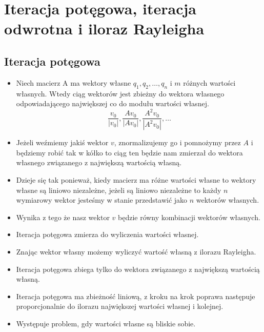 \documentclass[a4paper]{article}
\begin{document}
\section{Iteracja potęgowa, iteracja odwrotna i iloraz Rayleigha}
\subsection{Iteracja potęgowa}
\begin{itemize}
    \item Niech macierz A ma wektory własne $q_1, q_2, \dots ,q_n$ i $m$ różnych wartości własnych. Wtedy ciąg wektorów jest zbieżny do wektora własnego odpowiadającego największej co do modułu wartości własnej.
    \begin{equation*}
        \frac{v_0}{|v_0|} , \frac{Av_0}{|Av_0|}, \frac{A^2v_0}{|A^2v_0|}, \dots
    \end{equation*}
    \item Jeżeli weźmiemy jakiś wektor $v$, znormalizujemy go i pomnożymy przez $A$ i będziemy robić tak w kółko to ciąg ten będzie nam zmierzał do wektora własnego związanego z największą wartością własną.
    \item Dzieje się tak ponieważ, kiedy macierz ma różne wartości własne to wektory własne są liniowo niezależne, jeżeli są liniowo niezależne to każdy $n$ wymiarowy wektor jesteśmy w stanie przedstawić jako $n$ wektorów własnych.
    \item Wynika z tego że nasz wektor $v$ będzie równy kombinacji wektorów własnych.
    \item Iteracja potęgowa zmierza do wyliczenia wartości własnej.
    \item Znając wektor własny możemy wyliczyć wartość własną z ilorazu Rayleigha.
    \item Iteracja potęgowa zbiega tylko do wektora związanego z największą wartością własną.
    \item Iteracja potęgowa ma zbieżność liniową, z kroku na krok poprawa następuje proporcjonalnie do ilorazu największej wartości własnej i kolejnej.
    \item Występuje problem, gdy wartości własne są bliskie sobie.
\end{itemize}
\end{document}
